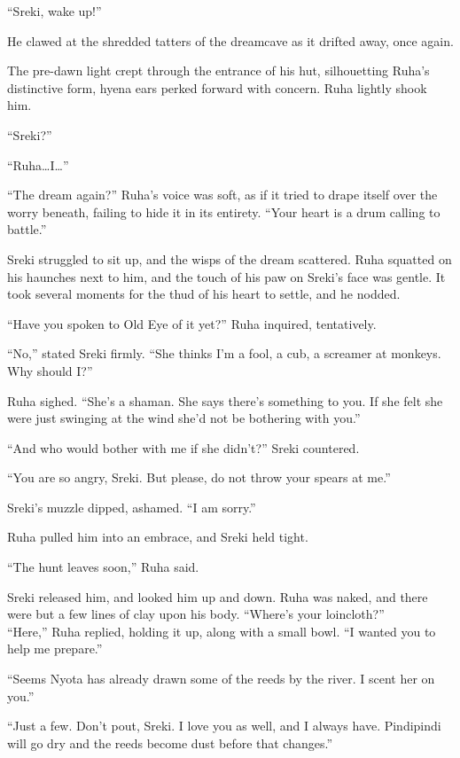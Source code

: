 \secdiv

\noindent ``Sreki, wake up!''

He clawed at the shredded tatters of the dreamcave as it drifted away, once again.

The pre-dawn light crept through the entrance of his hut, silhouetting Ruha's distinctive form, hyena ears perked forward with concern. Ruha lightly shook him.

``Sreki?''

``Ruha\ldots{}I\ldots''

``The dream again?'' Ruha's voice was soft, as if it tried to drape itself over the worry beneath, failing to hide it in its entirety. ``Your heart is a drum calling to battle.''

Sreki struggled to sit up, and the wisps of the dream scattered. Ruha squatted on his haunches next to him, and the touch of his paw on Sreki's face was gentle. It took several moments for the thud of his heart to settle, and he nodded.

``Have you spoken to Old Eye of it yet?'' Ruha inquired, tentatively.

``No,'' stated Sreki firmly. ``She thinks I'm a fool, a cub, a screamer at monkeys. Why should I?''

Ruha sighed. ``She's a shaman. She says there's something to you. If she felt she were just swinging at the wind she'd not be bothering with you.''

``And who would bother with me if she didn't?'' Sreki countered.

``You are so angry, Sreki. But please, do not throw your spears at me.''

Sreki's muzzle dipped, ashamed. ``I am sorry.''

Ruha pulled him into an embrace, and Sreki held tight.

``The hunt leaves soon,'' Ruha said.

Sreki released him, and looked him up and down. Ruha was naked, and there were but a few lines of clay upon his body. ``Where's your loincloth?''\\
``Here,'' Ruha replied, holding it up, along with a small bowl. ``I wanted you to help me prepare.''

``Seems Nyota has already drawn some of the reeds by the river. I scent her on you.''

``Just a few. Don't pout, Sreki. I love you as well, and I always have. Pindipindi will go dry and the reeds become dust before that changes.''

